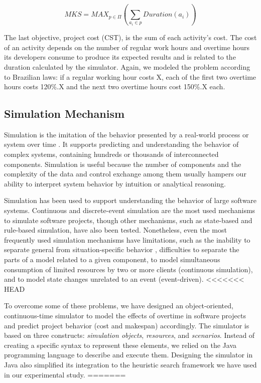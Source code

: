 \documentclass[conference]{IEEEtran}
\begin{document}
\setlength\abovedisplayshortskip{0pt}
\setlength\belowdisplayshortskip{0pt}
\begin{small}
\begin{equation}
MKS = MAX_{p\in\Pi} (\sum_{a_{i} \in p} Duration (a_{i}))
\end{equation}
\end{small}

The last objective, project cost (CST), is the sum of each activity's cost. The cost of an activity depends on the number of regular work hours and overtime hours its developers consume to produce its expected results and is related to the duration calculated by the simulator. Again, we modeled the problem according to Brazilian laws: if a regular working hour costs X, each of the first two overtime hours costs 120\%.X and the next two overtime hours cost 150\%.X each.


\subsection{Simulation Mechanism}
Simulation is the imitation of the behavior presented by a real-world process or system over time \cite{Banks:2000}. It supports predicting and understanding the behavior of complex systems, containing hundreds or thousands of interconnected components. Simulation is useful because the number of components and the complexity of the data and control exchange among them usually hampers our ability to interpret system behavior by intuition or analytical reasoning.

Simulation has been used to support understanding the behavior of large software systems. Continuous \cite{Forrester:1961} and discrete-event \cite{Ross:1990} simulation are the most used mechanisms to simulate software projects, though other mechanisms, such as state-based \cite{harel:1990} and rule-based \cite{Drappa:1999} simulation, have also been tested. Nonetheless, even the most frequently used simulation mechanisms have limitations, such as the inability to separate general from situation-specific behavior \cite{Barros:2002}, difficulties to separate the parts of a model related to a given component, to model simultaneous consumption of limited resources by two or more clients (continuous simulation), and to model state changes unrelated to an event (event-driven).
<<<<<<< HEAD

To overcome some of these problems, we have designed an object-oriented, continuous-time simulator to model the effects of overtime in software projects and predict project behavior (cost and makespan) accordingly. The simulator is based on three constructs: {\it simulation objects}, {\it resources}, and {\it scenarios}. Instead of creating a specific syntax to represent these elements, we relied on the Java programming language to describe and execute them. Designing the simulator in Java also simplified its integration to the heuristic search framework we have used in our experimental study.
=======
\end{document}
